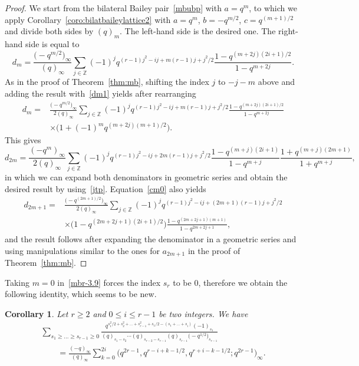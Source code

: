 \documentclass[pdftex]{sigma}
\numberwithin{equation}{section}
\newtheorem{Corollary}[Theorem]{Corollary}
\begin{document}
\begin{proof}
We start from the bilateral Bailey pair~\eqref{mbubp} with $a=q^m$, to which we apply Corollary~\ref{coro:bilatbaileylattice2} with $a=q^m$, $b=-q^{m/2}$, $c=q^{(m+1)/2}$ and divide both sides by $(q)_m$. The left-hand side is the desired one. The right-hand side is equal to
\begin{equation}\label{dm1}
d_m=\frac{\bigl(-q^{m/2}\bigr)_\infty}{(q)_\infty}\sum_{j\in\mathbb{Z}}(-1)^jq^{(r-1)j^2-ij+m(r-1)j+j^2/2}\frac{1-q^{(m+2j)(2i+1)/2}}{1-q^{m+2j}}.
\end{equation}
As in the proof of Theorem~\ref{thm:mb}, shifting the index $j$ to $-j-m$ above and adding the result with~\eqref{dm1} yields after rearranging
\begin{align}
d_{m}={}&\frac{\bigl(-q^{m/2}\bigr)_\infty}{2(q)_\infty}\sum_{j\in\mathbb{Z}}(-1)^jq^{(r-1)j^2-ij+m(r-1)j+j^2/2}\frac{1-q^{(m+2j)(2i+1)/2}}{1-q^{m+2j}}\nonumber\\
&\times\bigl(1+(-1)^mq^{(m+2j)(m+1)/2}\bigr).\label{dm0}
\end{align}
This gives
\begin{equation*}
d_{2m}=\frac{(-q^{m})_\infty}{2(q)_\infty}\sum_{j\in\mathbb{Z}}(-1)^jq^{(r-1)j^2-ij+2m(r-1)j+j^2/2}\frac{1-q^{(m+j)(2i+1)}}{1-q^{m+j}}\frac{1+q^{(m+j)(2m+1)}}{1+q^{m+j}},
\end{equation*}
in which we can expand both denominators in geometric series and obtain the desired result by using~\eqref{jtp}. Equation~\eqref{cm0} also yields
\begin{align*}
d_{2m+1}={}&\frac{\bigl(-q^{(2m+1)/2}\bigr)_\infty}{2(q)_\infty}\sum_{j\in\mathbb{Z}}(-1)^jq^{(r-1)j^2-ij+(2m+1)(r-1)j+j^2/2}\\
&\times\bigl(1-q^{(2m+2j+1)(2i+1)/2}\bigr)\frac{1-q^{(2m+2j+1)(m+1)}}{1-q^{2m+2j+1}},
\end{align*}
and the result follows after expanding the denominator in a geometric series and using manipulations similar to the ones for $a_{2m+1}$ in the proof of Theorem~\ref{thm:mb}.
\end{proof}

 Taking $m=0$ in~\eqref{mbr-3.9} forces the index $s_r$ to be $0$, therefore we obtain the following identity, which seems to be new.
\begin{Corollary}\label{coro:new2}
Let $r \geq 2$ and $0 \leq i \leq r-1$ be two integers. We have
\begin{gather*}%
\sum_{s_1\geq\dots\geq s_{r-1}\geq0}\frac{q^{s_1^2/2+s_2^2+\dots+s_{r-1}^2+s_1/2-(s_1+\dots+s_{i})}(-1)_{s_1}}{(q)_{s_1-s_2}\cdots(q)_{s_{r-2}-s_{r-1}}(q)_{s_{r-1}}\bigl(-q^{1/2}\bigr)_{s_{r-1}}} \\
\qquad=\frac{(-q)_\infty}{(q)_\infty}\sum_{k=0}^{2i}\bigl(q^{2r-1},q^{r-i+k-1/2},q^{r+i-k-1/2};q^{2r-1}\bigr)_\infty.
\end{gather*}
\end{Corollary}
\end{document}
